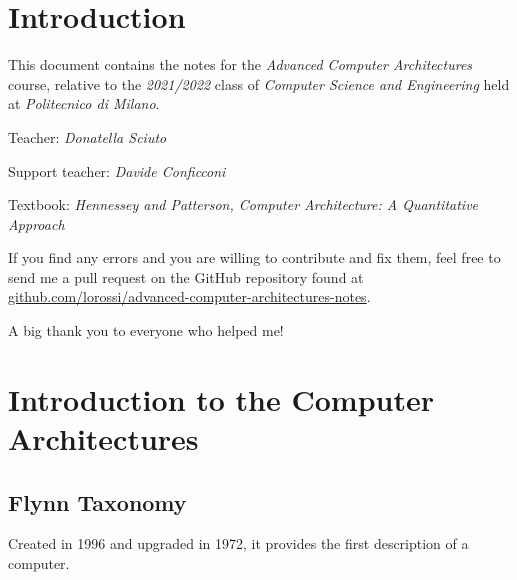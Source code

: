\documentclass[english]{article}
\begin{document}

\section*{Introduction}

This document contains the notes for the \textit{Advanced Computer Architectures} course, relative to the \textit{2021/2022} class of \textit{Computer Science and Engineering} held at \textit{Politecnico di Milano}.

Teacher: \textit{Donatella Sciuto}

Support teacher: \textit{Davide Conficconi}

Textbook: \textit{Hennessey and Patterson, Computer Architecture: A Quantitative Approach}

\bigskip

If you find any errors and you are willing to contribute and fix them, feel free to send me a pull request on the GitHub repository found at \href{https://github.com/lorossi/advanced-computer-architectures-notes}{github.com/lorossi/advanced-computer-architectures-notes}.

\bigskip

A big thank you to everyone who helped me!

\newpage

\section{Introduction to the Computer Architectures}

\subsection{Flynn Taxonomy}
\label{sec:flynn-taxonomy}

Created in 1996 and upgraded in 1972, it provides the first description of a computer.
\end{document}
